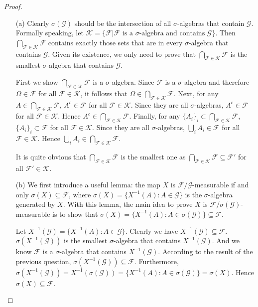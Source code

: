 \begin{proof}
\begin{enumerate}
    \item[(a)] Clearly $\sigma(\mathcal{G})$ should be the intersection of all $\sigma$-algebras that contain $\mathcal{G}$. Formally speaking, let $\mathcal{K} = \{\mathcal{F} | \mathcal{F} \mbox{ is a }\sigma\mbox{-algebra and contains } \mathcal{G}\}$. Then $\bigcap_{\mathcal{F} \in \mathcal{K}}\mathcal{F}$ contains exactly those sets that are in every $\sigma$-algebra that contains $\mathcal{G}$. Given its existence, we only need to prove that $\bigcap_{\mathcal{F} \in \mathcal{K}}\mathcal{F}$ is the smallest $\sigma$-algebra that contains $\mathcal{G}$.

    First we show $\bigcap_{\mathcal{F} \in \mathcal{K}}\mathcal{F}$ is a $\sigma$-algebra. Since $\mathcal{F}$ is a $\sigma$-algebra and therefore $\Omega \in \mathcal{F}$ for all $\mathcal{F} \in \mathcal{K}$, it follows that $\Omega \in \bigcap_{\mathcal{F} \in \mathcal{K}}\mathcal{F}$. Next, for any $A \in \bigcap_{\mathcal{F} \in \mathcal{K}}\mathcal{F}$, $A^c \in \mathcal{F}$ for all $\mathcal{F} \in \mathcal{K}$. Since they are all $\sigma$-algebras, $A^c \in \mathcal{F}$ for all $\mathcal{F} \in \mathcal{K}$. Hence $A^c \in \bigcap_{\mathcal{F} \in \mathcal{K}}\mathcal{F}$. Finally, for any $\{A_i\}_i \subset \bigcap_{\mathcal{F} \in \mathcal{K}}\mathcal{F}$, $\{A_i\}_i \subset \mathcal{F}$ for all $\mathcal{F} \in \mathcal{K}$. Since they are all $\sigma$-algebras, $\bigcup_i A_i \in \mathcal{F}$ for all $\mathcal{F} \in \mathcal{K}$. Hence $\bigcup_i A_i \in \bigcap_{\mathcal{F} \in \mathcal{K}}\mathcal{F}$.

    It is quite obvious that $\bigcap_{\mathcal{F} \in \mathcal{K}}\mathcal{F}$ is the smallest one as $\bigcap_{\mathcal{F} \in \mathcal{K}}\mathcal{F} \subseteq \mathcal{F}'$ for all $\mathcal{F}' \in \mathcal{K}$.

    \item[(b)] We first introduce a useful lemma: the map $X$ is $\mathcal{F} / \mathcal{G}$-measurable if and only $\sigma(X) \subseteq \mathcal{F}$, where $\sigma(X) = \{X^{-1}(A): A \in \mathcal{G}\}$ is the $\sigma$-algebra generated by $X$. With this lemma, the main idea to prove $X$ is $\mathcal{F} / \sigma(\mathcal{G})$-measurable is to show that $\sigma(X) = \{X^{-1}(A): A \in \sigma(\mathcal{G})\} \subseteq \mathcal{F}$.

    Let $X^{-1}(\mathcal{G}) = \{X^{-1}(A): A \in \mathcal{G}\}$. Clearly we have $X^{-1}(\mathcal{G}) \subseteq \mathcal{F}$. $\sigma(X^{-1}(\mathcal{G}))$ is the smallest $\sigma$-algebra that contains $X^{-1}(\mathcal{G})$. And we know $\mathcal{F}$ is a $\sigma$-algebra that contains $X^{-1}(\mathcal{G})$. According to the result of the previous question, $\sigma(X^{-1}(\mathcal{G})) \subseteq \mathcal{F}$. Furthermore, $\sigma(X^{-1}(\mathcal{G})) = X^{-1}(\sigma(\mathcal{G})) = \{X^{-1}(A): A \in \sigma(\mathcal{G})\} = \sigma(X)$. Hence $\sigma(X) \subseteq \mathcal{F}$.


\end{enumerate}
\end{proof}
